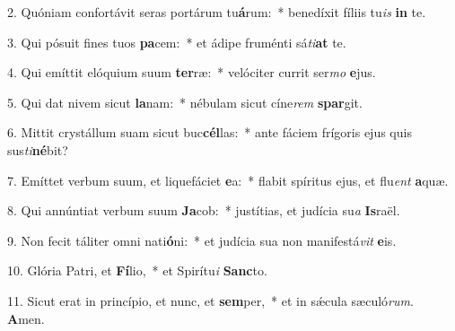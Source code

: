 2. Quóniam confortávit seras portárum tu\textbf{á}rum:~*  benedíxit fíliis tu\textit{is} \textbf{in} te.\

3. Qui pósuit fines tuos \textbf{pa}cem:~*  et ádipe fruménti sá\textit{ti}\textbf{at} te.\

4. Qui emíttit elóquium suum \textbf{ter}ræ:~*  velóciter currit ser\textit{mo} \textbf{e}jus.\

5. Qui dat nivem sicut \textbf{la}nam:~*  nébulam sicut cíne\textit{rem} \textbf{spar}git.\

6. Mittit crystállum suam sicut buc\textbf{cél}las:~*  ante fáciem frígoris ejus quis sus\textit{ti}\textbf{né}bit?\

7. Emíttet verbum suum, et liquefáciet \textbf{e}a:~*  flabit spíritus ejus, et flu\textit{ent} \textbf{a}quæ.\

8. Qui annúntiat verbum suum \textbf{Ja}cob:~*  justítias, et judícia su\textit{a} \textbf{Is}raël.\

9. Non fecit táliter omni nati\textbf{ó}ni:~*  et judícia sua non manifestá\textit{vit} \textbf{e}is.\

10. Glória Patri, et \textbf{Fí}lio,~*  et Spirítu\textit{i} \textbf{Sanc}to.\

11. Sicut erat in princípio, et nunc, et \textbf{sem}per,~*  et in sǽcula sæculó\textit{rum}. \textbf{A}men.\

